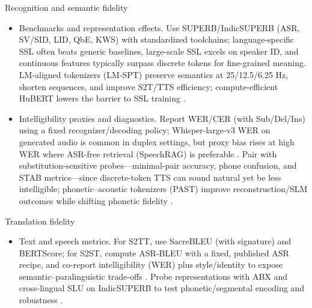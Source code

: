 \documentclass{article}
\begin{document}
Recognition and semantic fidelity
\begin{itemize}
  \item Benchmarks and representation effects. Use SUPERB/IndicSUPERB (ASR, SV/SID, LID, QbE, KWS) with standardized toolchains; language-specific SSL often beats generic baselines, large-scale SSL excels on speaker ID, and continuous features typically surpass discrete tokens for fine-grained meaning. LM-aligned tokenizers (LM‑SPT) preserve semantics at 25/12.5/6.25 Hz, shorten sequences, and improve S2T/TTS efficiency; compute-efficient HuBERT lowers the barrier to SSL training \cite{entry2025indicsuperbspeechprocessinguniversalperf,jo2025lmsptalignedsemanticdistillationspeechto,wang2024comparativestudydiscretespeechtokenssema,chen2023reducingbarriersselfsupervisedlearninghu}.
  \item Intelligibility proxies and diagnostics. Report WER/CER (with Sub/Del/Ins) using a fixed recognizer/decoding policy; Whisper‑large‑v3 WER on generated audio is common in duplex settings, but proxy bias rises at high WER where ASR-free retrieval (SpeechRAG) is preferable \cite{ma2024languagemodelcanlistenwhilespeaking,min2025speechretrievalaugmentedgenerationwithou,maimon2025salmonsuiteacousticlanguagemodelevaluati}. Pair with substitution-sensitive probes—minimal-pair accuracy, phone confusion, and STAB metrics—since discrete-token TTS can sound natural yet be less intelligible; phonetic–acoustic tokenizers (PAST) improve reconstruction/SLM outcomes while shifting phonetic fidelity \cite{vashishth2024stabspeechtokenizerassessmentbenchmark,har-tuv2025pastphoneticacousticspeechtokenizer,tseng2025evaluationllmsspeechisoftenflawedtestset,wang2024evaluatingtextspeechsynthesislargediscre}.
\end{itemize}

Translation fidelity
\begin{itemize}
  \item Text and speech metrics. For S2TT, use SacreBLEU (with signature) and BERTScore; for S2ST, compute ASR‑BLEU with a fixed, published ASR recipe, and co-report intelligibility (WER) plus style/identity to expose semantic–paralinguistic trade-offs \cite{peng2024mslms2stmultitaskspeechlanguagemodeltext,jo2025lmsptalignedsemanticdistillationspeechto,chen2023reducingbarriersselfsupervisedlearninghu,entry2025indicsuperbspeechprocessinguniversalperf}. Probe representations with ABX and cross-lingual SLU on IndicSUPERB to test phonetic/segmental encoding and robustness \cite{fily2024establishingdegreesclosenessbetweenaudio,entry2025indicsuperbspeechprocessinguniversalperf}.
\end{itemize}
\end{document}
